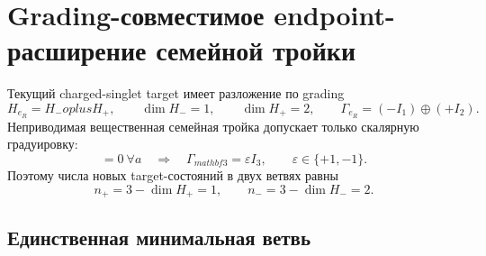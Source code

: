 \chapter{Grading-совместимое endpoint-расширение семейной тройки}
\label{ch:v8-baryon-c0-grading-compatible-family-triplet-endpoint-extension-gate}

Текущий charged-singlet target имеет разложение по grading
\begin{equation}
 H_{e_R}=H_-oplus H_+,
 \qquad \dim H_-=1,\qquad \dim H_+=2,
 \qquad \Gamma_{e_R}=(-I_1)\oplus(+I_2).
 \label{eq:v8-baryon-c0-current-target-grading-split}
\end{equation}
Неприводимая вещественная семейная тройка допускает только скалярную
градуировку:
\begin{equation}
 [\Gamma_{mathbf3},J_a]=0\ \forall a
 \quad\Longrightarrow\quad
 \Gamma_{mathbf3}=\varepsilon I_3,
 \qquad \varepsilon\in\{+1,-1\}.
 \label{eq:v8-baryon-c0-family-triplet-scalar-grading}
\end{equation}
Поэтому числа новых target-состояний в двух ветвях равны
\begin{equation}
 n_+=3-\dim H_+=1,
 \qquad n_-=3-\dim H_-=2.
 \label{eq:v8-baryon-c0-homogeneous-triplet-extension-counts}
\end{equation}

\section{Единственная минимальная ветвь}

